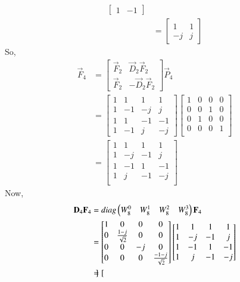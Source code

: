 \documentclass[journal,12pt,twocolumn]{IEEEtran}
\renewcommand\thesection{\arabic{section}}
\begin{document}
\begin{enumerate}[label=\arabic*.,ref=\thesection.\theenumi]
\begin{align}
\begin{bmatrix}
	1&-1
\end{bmatrix}\\
&=\begin{bmatrix}
	1& 1\\
	-j&j
\end{bmatrix}
\end{align}
So,
\begin{align}
	\vec{F}_4&=\begin{bmatrix}
		\vec{F}_{2}&\vec{D}_{2}\vec{F}_{2}\\
		\vec{F}_{2}&-\vec{D}_{2}\vec{F}_{2}
	\end{bmatrix}\vec{P}_4\\
&=\begin{bmatrix}
	1& 1&1& 1\\
	1&-1&-j&j\\
	1& 1&-1& -1\\
	1&-1&j&-j
\end{bmatrix}\begin{bmatrix}
1&0&0&0\\
0&0&1&0\\
0&1&0&0\\
0&0&0&1\\
\end{bmatrix}\\
&=\begin{bmatrix}
	1&1&1&1\\
	1&-j&-1&j\\
	1&-1&1&-1\\
	1&j&-1&-j\\
\end{bmatrix}
\end{align}
Now,
\begin{align}
	\mathbf{D}_{4}\mathbf{F}_{4}&=diag\begin{pmatrix}W_{8}^{0} & W_{8}^{1}&W_{8}^{2}&W_{8}^{3}\end{pmatrix}\mathbf{F}_{4}\\
	&=\begin{bmatrix}
		1&0&0&0\\
		0&\frac{1-j}{\sqrt{2}}&0&0\\
		0&0&-j&0\\
		0&0&0&\frac{-1-j}{\sqrt{2}}
	\end{bmatrix}
\begin{bmatrix}
	1&1&1&1\\
	1&-j&-1&j\\
	1&-1&1&-1\\
	1&j&-1&-j\\
\end{bmatrix}\\
&=\begin{bmatrix}

\end{bmatrix}
\end{align}
\end{enumerate}
\end{document}

